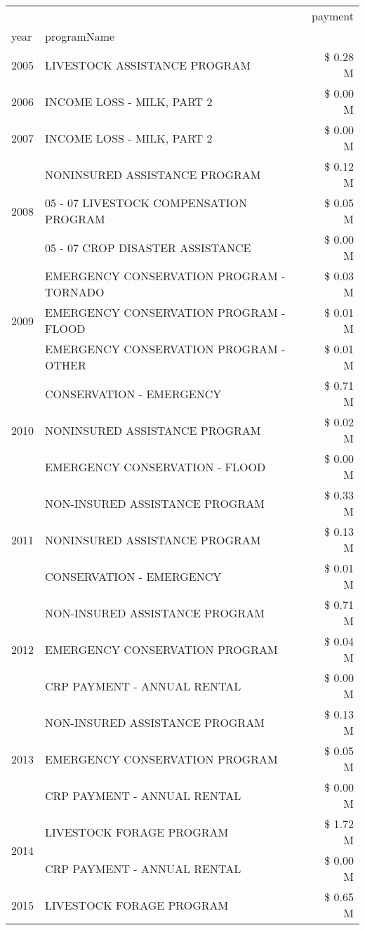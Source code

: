 \begin{tabular}{llr}
\toprule
 &  & payment \\
year & programName &  \\
\midrule
2005 & LIVESTOCK ASSISTANCE PROGRAM & \$ 0.28 M \\
\cline{1-3}
2006 & INCOME LOSS - MILK, PART 2 & \$ 0.00 M \\
\cline{1-3}
2007 & INCOME LOSS - MILK, PART 2 & \$ 0.00 M \\
\cline{1-3}
\multirow[t]{3}{*}{2008} & NONINSURED ASSISTANCE PROGRAM & \$ 0.12 M \\
 & 05 - 07 LIVESTOCK COMPENSATION PROGRAM & \$ 0.05 M \\
 & 05 - 07 CROP DISASTER ASSISTANCE & \$ 0.00 M \\
\cline{1-3}
\multirow[t]{3}{*}{2009} & EMERGENCY CONSERVATION PROGRAM - TORNADO & \$ 0.03 M \\
 & EMERGENCY CONSERVATION PROGRAM - FLOOD & \$ 0.01 M \\
 & EMERGENCY CONSERVATION PROGRAM - OTHER & \$ 0.01 M \\
\cline{1-3}
\multirow[t]{3}{*}{2010} & CONSERVATION - EMERGENCY & \$ 0.71 M \\
 & NONINSURED ASSISTANCE PROGRAM & \$ 0.02 M \\
 & EMERGENCY CONSERVATION - FLOOD & \$ 0.00 M \\
\cline{1-3}
\multirow[t]{3}{*}{2011} & NON-INSURED ASSISTANCE PROGRAM & \$ 0.33 M \\
 & NONINSURED ASSISTANCE PROGRAM & \$ 0.13 M \\
 & CONSERVATION - EMERGENCY & \$ 0.01 M \\
\cline{1-3}
\multirow[t]{3}{*}{2012} & NON-INSURED ASSISTANCE PROGRAM & \$ 0.71 M \\
 & EMERGENCY CONSERVATION PROGRAM & \$ 0.04 M \\
 & CRP PAYMENT - ANNUAL RENTAL & \$ 0.00 M \\
\cline{1-3}
\multirow[t]{3}{*}{2013} & NON-INSURED ASSISTANCE PROGRAM & \$ 0.13 M \\
 & EMERGENCY CONSERVATION PROGRAM & \$ 0.05 M \\
 & CRP PAYMENT - ANNUAL RENTAL & \$ 0.00 M \\
\cline{1-3}
\multirow[t]{2}{*}{2014} & LIVESTOCK FORAGE PROGRAM & \$ 1.72 M \\
 & CRP PAYMENT - ANNUAL RENTAL & \$ 0.00 M \\
\cline{1-3}
\multirow[t]{3}{*}{2015} & LIVESTOCK FORAGE PROGRAM & \$ 0.65 M \\

\end{tabular}
